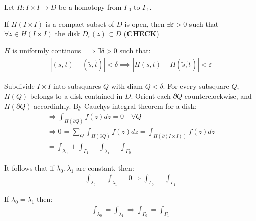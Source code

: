 \begin{prf}[]{}
  Let $H: I\times I\to D$ be a homotopy from $\Gamma_0$ to $\Gamma_1$.
  \par\bigskip
  \noindent If $H(I\times I)$ is a compact subset of $D$ is open, then $\exists\varepsilon>0$  such that $\forall z\in H(I\times I)$ the disk $D_\varepsilon(z)\subset D$ (\textbf{CHECK})
  \par\bigskip
  \noindent $H$ is uniformly continous $\implies\exists \delta>0$ such that:
  \begin{equation*}
    \begin{gathered}
      \left|(s,t)-(\tilde{s}, \tilde{t})\right|<\delta\implies \left|H(s,t)-H(\tilde{s}, \tilde{t})\right| <\varepsilon
    \end{gathered}
  \end{equation*}
  \par\bigskip
  \noindent Subdivide $I\times I$ into subsquares $Q$  with diam $Q<\delta$. For every subsquare $Q$, $H(Q)$ belongs to a disk contained in $D$. Orient each $\partial Q$ counterclockwise, and $H(\partial Q)$ accordinhly. By Cauchys integral theorem for a disk:
  \begin{equation*}
    \begin{gathered}
      \Rightarrow \int_{H(\partial Q)}f(z)dz = 0\quad\forall Q\\
      \Rightarrow 0 = \sum_{Q}\int_{H(\partial Q)}f(z)dz = \int_{H(\partial (I\times I))}f(z)dz\\
      = \int_{\lambda_0} + \int_{\Gamma_1}-\int_{\lambda_1}-\int_{\Gamma_0}
    \end{gathered}
  \end{equation*}
  \par\bigskip
  \noindent It follows that if $\lambda_0, \lambda_1$ are constant, then:
  \begin{equation*}
    \begin{gathered}
      \int_{\lambda_0} = \int_{\lambda_1} = 0\Rightarrow \int_{\Gamma_0} = \int_{\Gamma_1}
    \end{gathered}
  \end{equation*}
  \par\bigskip
  \noindent If $\lambda_0 = \lambda_1$ then:
  \begin{equation*}
    \begin{gathered}
      \int_{\lambda_0} = \int_{\lambda_1}\Rightarrow \int_{\Gamma_0} = \int_{\Gamma_1}
    \end{gathered}
  \end{equation*}
\end{prf}
